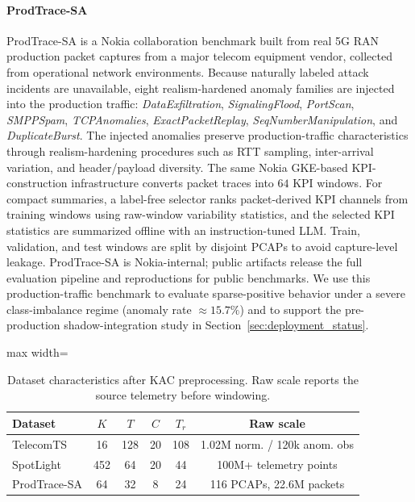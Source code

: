 \documentclass[conference]{IEEEtran}
\begin{document}
\paragraph{ProdTrace-SA}
ProdTrace-SA is a Nokia collaboration benchmark built from real 5G RAN production packet captures from a major telecom equipment vendor, collected from operational network environments. Because naturally labeled attack incidents are unavailable, eight realism-hardened anomaly families are injected into the production traffic: \emph{DataExfiltration}, \emph{SignalingFlood}, \emph{PortScan}, \emph{SMPPSpam}, \emph{TCPAnomalies}, \emph{ExactPacketReplay}, \emph{SeqNumberManipulation}, and \emph{DuplicateBurst}. The injected anomalies preserve production-traffic characteristics through realism-hardening procedures such as RTT sampling, inter-arrival variation, and header/payload diversity. The same Nokia GKE-based KPI-construction infrastructure converts packet traces into $64$ KPI windows. For compact summaries, a label-free selector ranks packet-derived KPI channels from training windows using raw-window variability statistics, and the selected KPI statistics are summarized offline with an instruction-tuned LLM. Train, validation, and test windows are split by disjoint PCAPs to avoid capture-level leakage. ProdTrace-SA is Nokia-internal; public artifacts release the full evaluation pipeline and reproductions for public benchmarks. We use this production-traffic benchmark to evaluate sparse-positive behavior under a severe class-imbalance regime (anomaly rate $\approx\!15.7\%$) and to support the pre-production shadow-integration study in Section~\ref{sec:deployment_status}.


\begin{table}[t]
  \centering
  \caption{Dataset characteristics after KAC preprocessing. Raw scale reports the source telemetry before windowing.}
  \label{tab:dataset_stats}
  \small
  \setlength{\tabcolsep}{4pt}
  \begin{adjustbox}{max width=\columnwidth}
  \begin{tabular}{lccccc}
    \toprule
    Dataset & $K$ & $T$ & $C$ & $T_r$ & Raw scale \\
    \midrule
    TelecomTS  & 16  & 128 & 20 & 108 & 1.02M norm. / 120k anom. obs \\
    SpotLight  & 452 & 64  & 20 & 44  & 100M+ telemetry points \\
    ProdTrace-SA & 64  & 32  & 8  & 24  & 116 PCAPs, 22.6M packets \\
    \bottomrule
  \end{tabular}
  \end{adjustbox}
\end{table}
\end{document}
